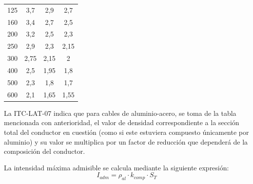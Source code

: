\begin{table}[htbp]
\begin{tabular}{|c|ccc|}
125                                                                      & \multicolumn{1}{c|}{3,7}                           & \multicolumn{1}{c|}{2,9}                              & 2,7                  \\
160                                                                      & \multicolumn{1}{c|}{3,4}                           & \multicolumn{1}{c|}{2,7}                              & 2,5                  \\
200                                                                      & \multicolumn{1}{c|}{3,2}                           & \multicolumn{1}{c|}{2,5}                              & 2,3                  \\
250                                                                      & \multicolumn{1}{c|}{2,9}                           & \multicolumn{1}{c|}{2,3}                              & 2,15                 \\
300                                                                      & \multicolumn{1}{c|}{2,75}                          & \multicolumn{1}{c|}{2,15}                             & 2                    \\
400                                                                      & \multicolumn{1}{c|}{2,5}                           & \multicolumn{1}{c|}{1,95}                             & 1,8                  \\
500                                                                      & \multicolumn{1}{c|}{2,3}                           & \multicolumn{1}{c|}{1,8}                              & 1,7                  \\
600                                                                      & \multicolumn{1}{c|}{2,1}                           & \multicolumn{1}{c|}{1,65}                             & 1,55                 \\ \hline
\end{tabular}
\end{table}

La ITC-LAT-07 indica que para cables de aluminio-acero, se toma de la tabla mencionada con anterioridad, el valor de densidad correspondiente a la sección total del conductor en cuestión (como si este estuviera compuesto únicamente por aluminio) y su valor se multiplica por un factor de reducción que dependerá de la composición del conductor.

La intensidad máxima admisible se calcula mediante la siguiente expresión:
\begin{equation}
I_{adm} = \rho_{al} \cdot k_{comp} \cdot S_{T}
\label{eq:intensidad-admisible}
\end{equation}

